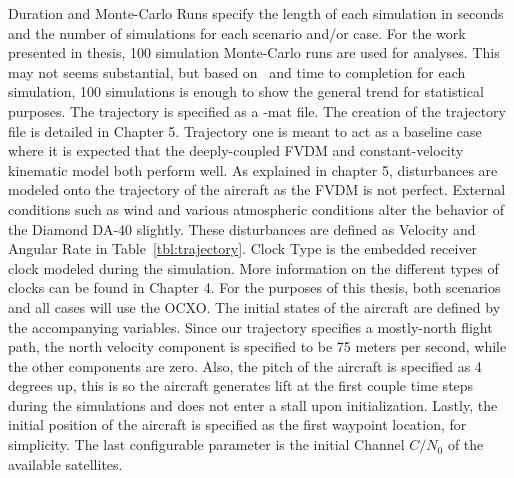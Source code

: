 Duration and Monte-Carlo Runs specify the length of each simulation in seconds and the number of simulations for each scenario and/or case. For the work presented in thesis, 100 simulation Monte-Carlo runs are used for analyses. This may not seems substantial, but based on~\cite{khaghaniAssessmentVDMbasedAutonomous2018,khaghaniAutonomousVehicleDynamic2016,mwenegohaModelbasedTightlyCoupled2020} and time to completion for each simulation, 100 simulations is enough to show the general trend for statistical purposes. The trajectory is specified as a -mat file. The creation of the trajectory file is detailed in Chapter 5. Trajectory one is meant to act as a baseline case where it is expected that the deeply-coupled FVDM and constant-velocity kinematic model both perform well.  As explained in chapter 5, disturbances are modeled onto the trajectory of the aircraft as the FVDM is not perfect. External conditions such as wind and various atmospheric conditions alter the behavior of the Diamond DA-40 slightly. These disturbances are defined as Velocity and Angular Rate in Table~\ref{tbl:trajectory}. Clock Type is the embedded receiver clock modeled during the simulation. More information on the different types of clocks can be found in Chapter 4. For the purposes of this thesis, both scenarios and all cases will use the OCXO\@. The initial states of the aircraft are defined by the accompanying variables. Since our trajectory specifies a mostly-north flight path, the north velocity component is specified to be 75 meters per second, while the other components are zero. Also, the pitch of the aircraft is specified as 4 degrees up, this is so the aircraft generates lift at the first couple time steps during the simulations and does not enter a stall upon initialization. Lastly, the initial position of the aircraft is specified as the first waypoint location, for simplicity. The last configurable parameter is the initial Channel \(C/N_0\) of the available satellites.


